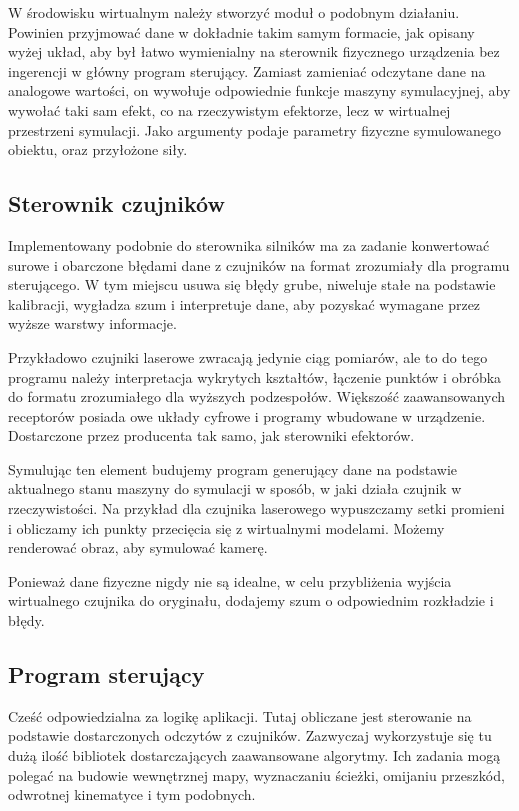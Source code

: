 W środowisku wirtualnym należy stworzyć moduł o podobnym działaniu.
Powinien przyjmować dane w dokładnie takim samym formacie, jak opisany wyżej układ, aby był łatwo wymienialny na sterownik fizycznego urządzenia bez ingerencji w główny program sterujący.
Zamiast zamieniać odczytane dane na analogowe wartości, on wywołuje odpowiednie funkcje maszyny symulacyjnej, aby wywołać taki sam efekt, co na rzeczywistym efektorze, lecz w wirtualnej przestrzeni symulacji.
Jako argumenty podaje parametry fizyczne symulowanego obiektu, oraz przyłożone siły.
 

\subsection{Sterownik czujników}
Implementowany podobnie do sterownika silników ma za zadanie konwertować surowe i obarczone błędami dane z czujników na format zrozumiały dla programu sterującego.
W tym miejscu usuwa się błędy grube, niweluje stałe na podstawie kalibracji, wygładza szum i interpretuje dane, aby pozyskać wymagane przez wyższe warstwy informacje.

Przykładowo czujniki laserowe zwracają jedynie ciąg pomiarów, ale to do tego programu należy interpretacja wykrytych kształtów, łączenie punktów i obróbka do formatu zrozumiałego dla wyższych podzespołów.
Większość zaawansowanych receptorów posiada owe układy cyfrowe i programy wbudowane w urządzenie.
Dostarczone przez producenta tak samo, jak sterowniki efektorów.
 
Symulując ten element budujemy program generujący dane na podstawie aktualnego stanu maszyny do symulacji w sposób, w jaki działa czujnik w rzeczywistości.
Na przykład dla czujnika laserowego wypuszczamy setki promieni i obliczamy ich punkty przecięcia się z wirtualnymi modelami.
Możemy renderować obraz, aby symulować kamerę.

Ponieważ dane fizyczne nigdy nie są idealne, w celu przybliżenia wyjścia wirtualnego czujnika do oryginału, dodajemy szum o odpowiednim rozkładzie i błędy.

\subsection{Program sterujący}
Cześć odpowiedzialna za logikę aplikacji. Tutaj obliczane jest sterowanie na podstawie dostarczonych odczytów z czujników.
Zazwyczaj wykorzystuje się tu dużą ilość bibliotek dostarczających zaawansowane algorytmy.
Ich zadania mogą polegać na budowie wewnętrznej mapy, wyznaczaniu ścieżki, omijaniu przeszkód, odwrotnej kinematyce i tym podobnych.

